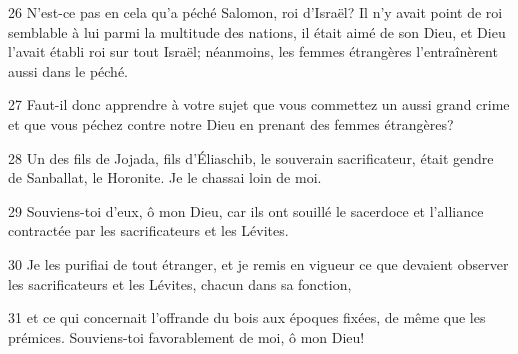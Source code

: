 \par 26 N'est-ce pas en cela qu'a péché Salomon, roi d'Israël? Il n'y avait point de roi semblable à lui parmi la multitude des nations, il était aimé de son Dieu, et Dieu l'avait établi roi sur tout Israël; néanmoins, les femmes étrangères l'entraînèrent aussi dans le péché.
\par 27 Faut-il donc apprendre à votre sujet que vous commettez un aussi grand crime et que vous péchez contre notre Dieu en prenant des femmes étrangères?
\par 28 Un des fils de Jojada, fils d'Éliaschib, le souverain sacrificateur, était gendre de Sanballat, le Horonite. Je le chassai loin de moi.
\par 29 Souviens-toi d'eux, ô mon Dieu, car ils ont souillé le sacerdoce et l'alliance contractée par les sacrificateurs et les Lévites.
\par 30 Je les purifiai de tout étranger, et je remis en vigueur ce que devaient observer les sacrificateurs et les Lévites, chacun dans sa fonction,
\par 31 et ce qui concernait l'offrande du bois aux époques fixées, de même que les prémices. Souviens-toi favorablement de moi, ô mon Dieu!


